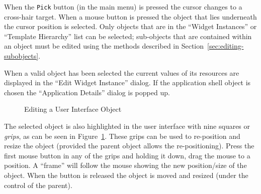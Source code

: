 When the {\tt Pick} button (in the main menu) is pressed the cursor
changes to a cross-hair target.
When a mouse button is pressed the object that lies
underneath the cursor position is selected. Only objects that are in the
``Widget Instances'' or ``Template Hierarchy'' list can be selected;
sub-objects that are contained within
an object must be edited using the methods described
in Section~\ref{sec:editing-subobjects}.

When a valid object has been selected the current values of its resources are
displayed in the ``Edit Widget Instance'' dialog. 
If the application shell object is chosen the
``Application Details'' dialog is popped up.

\begin{figure}
\centerline{}
\caption{Editing a User Interface Object}
\label{fig:editing}
\end{figure}
The selected object is also highlighted in the user interface with
nine squares or {\em grips}, as can be seen in Figure~\ref{fig:editing}.
These grips can be used to re-position and resize the object (provided the
parent object allows the re-positioning).  Press the first mouse button in
any of the grips and holding it down, drag the mouse to a position.  A
``frame'' will follow the mouse showing the new position/size of the object.
When the button is released the object is moved and resized (under the
control of the parent). 

